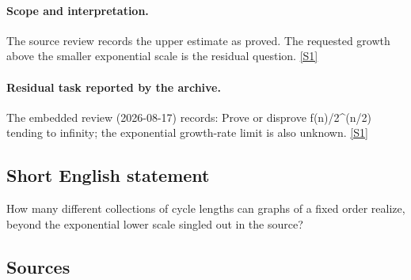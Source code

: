\documentclass[11pt,a4paper]{article}
\newcommand{\sref}[2]{\hyperlink{source:#1:#2}{[S#2]}}
\begin{document}
\paragraph{Scope and interpretation.}

The source review records the upper estimate as proved. The requested growth above the smaller exponential scale is the residual question. \sref{1919}{1}

\paragraph{Residual task reported by the archive.}

The embedded review (2026-08-17) records: Prove or disprove f(n)/2\textasciicircum{}(n/2) tending to infinity; the exponential growth-rate limit is also unknown. \sref{1919}{1}

\subsection{Short English statement}

How many different collections of cycle lengths can graphs of a fixed order realize, beyond the exponential lower scale singled out in the source?

\subsection{Sources}
\end{document}
